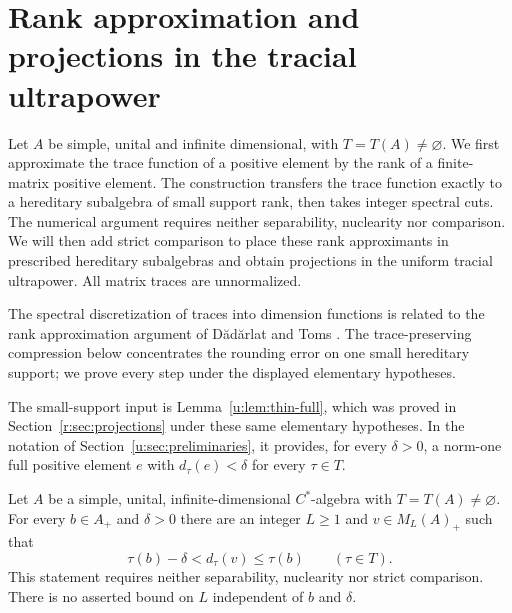 \section{Rank approximation and projections in the tracial ultrapower}
\label{u:sec:ranks}

Let $A$ be simple, unital and infinite dimensional, with
$T=T(A)\ne\varnothing$.  We first approximate the trace function of a
positive element by the rank of a finite-matrix positive element.
The construction transfers the trace function exactly to a hereditary
subalgebra of small support rank, then takes integer spectral cuts.
The numerical argument requires neither separability, nuclearity nor
comparison.  We will then add strict comparison to place these rank
approximants in prescribed hereditary subalgebras and obtain projections
in the uniform tracial ultrapower.  All matrix traces are unnormalized.

The spectral discretization of traces into dimension functions is related
to the rank approximation argument of D\u ad\u arlat and Toms
\cite[proof of Theorem~5.1]{DadarlatToms}. The trace-preserving compression
below concentrates the rounding error on one small hereditary support;
we prove every step under the displayed elementary hypotheses.

The small-support input is Lemma~\ref{u:lem:thin-full}, which was
proved in Section~\ref{r:sec:projections} under these same elementary
hypotheses.  In the notation of Section~\ref{u:sec:preliminaries}, it
provides, for every $\delta>0$, a norm-one full positive element $e$
with $d_\tau(e)<\delta$
for every $\tau\in T$.

\begin{proposition}
\label{u:prop:rank-approximation}
Let $A$ be a simple, unital, infinite-dimensional $C^*$-algebra with
$T=T(A)\ne\varnothing$.  For every $b\in A_+$ and $\delta>0$ there
are an integer $L\ge1$ and $v\in M_L(A)_+$ such that
\begin{equation}
 \tau(b)-\delta<d_\tau(v)\le\tau(b)
 \qquad(\tau\in T).
 \label{u:eq:rank-approximation}
\end{equation}
This statement requires neither separability, nuclearity nor strict
comparison.  There is no asserted bound on $L$ independent of $b$ and
$\delta$.
\end{proposition}


